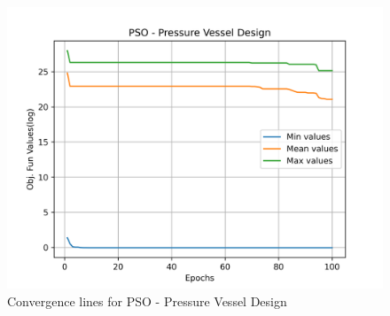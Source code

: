\begin{figure}[H]
\centering
\caption{Convergence lines for PSO - Pressure Vessel Design}
\label{fig:pressure_vessel_problem_solve_pso}
\includegraphics[scale=0.5]{images/pressure_vessel_problem_solve_pso.png}
\end{figure}
